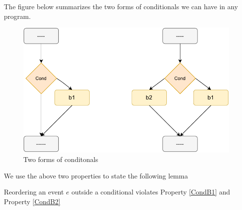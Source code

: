         The figure below summarizes the two forms of conditionals we can have in any program. 
        \begin{figure}[H]
            \centering 
            \includegraphics[scale=0.7]{5.InstructionReordering/5.ValidReorderingProgram/Conditionals2Form.pdf}
            \caption{Two forms of conditonals}
        \end{figure}


        We use the above two properties to state the following lemma 
        \begin{lemma}
            \label{CondBranchLemma}
            Reordering an event $e$ outside a conditional violates Property \ref{CondB1} and Property \ref{CondB2}
        \end{lemma}

